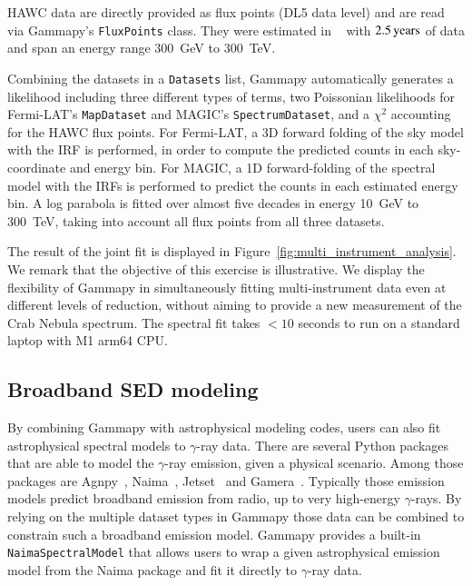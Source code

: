 \documentclass[longauth]{aa}
\newcommand{\code}[1]{\texttt{#1}}
\newcommand{\gammapy}{Gammapy\xspace}
\newcommand{\hawc}{HAWC\xspace}
\newcommand{\magic}{MAGIC\xspace}
\newcommand{\irfs}{IRFs\xspace}
\newcommand{\fermi}{Fermi-LAT\xspace}
\newcommand{\gammaray}{$\gamma$-ray\xspace}
\newcommand{\gammarays}{$\gamma$-rays\xspace}
\begin{document}
\hawc data are directly provided as flux points (DL5 data level) and are read
via Gammapy's \code{FluxPoints} class. They were estimated in ~\cite{hawc_crab_2019}
with $2.5\,{\rm years}$ of data and span an energy range \SI{300}{GeV} to \SI{300}{TeV}.

Combining the datasets in a \code{Datasets} list, \gammapy automatically generates
a likelihood including three different types of terms, two Poissonian likelihoods
for \fermi's \code{MapDataset} and MAGIC's \code{SpectrumDataset}, and a $\chi^2$
accounting for the \hawc flux points. For \fermi, a 3D forward folding
of the sky model with the IRF is performed, in order to compute the predicted counts
in each sky-coordinate and energy bin. For \magic, a 1D forward-folding
of the spectral model with the \irfs is performed to predict the counts in each estimated energy bin. A log
parabola is fitted over almost five decades in energy \SI{10}{GeV} to \SI{300}{TeV}, taking into account all flux points from all three datasets.

The result of the joint fit is displayed in
Figure~\ref{fig:multi_instrument_analysis}. We remark that the objective of this
exercise is illustrative. We display the flexibility of \gammapy in
simultaneously fitting multi-instrument data even at different levels of
reduction, without aiming to provide a new measurement of the Crab Nebula
spectrum. The spectral fit takes $<10$ seconds to run on a standard laptop with M1 arm64 CPU.


\subsection{Broadband SED modeling}
\label{ssec:broadband-sed-modeling}
By combining \gammapy with astrophysical modeling codes, users can also fit
astrophysical spectral models to \gammaray data. 
There are several Python packages that are able to model
the \gammaray emission, given a physical scenario. Among those
packages are Agnpy~\citep{agnpy2022}, Naima~\citep{naima}, Jetset~\citep{jetset}
and Gamera~\citep{gamera}.
Typically those emission models predict broadband emission from
radio, up to very high-energy \gammarays.
By relying on the multiple dataset types in \gammapy those
data can be combined to constrain such a broadband emission model.
\gammapy provides a built-in \code{NaimaSpectralModel} that allows
users to wrap a given astrophysical emission model from the
Naima package and fit it directly to \gammaray data.
\end{document}
